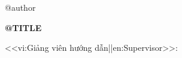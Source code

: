 \begin{titlepage}
  \begin{center}
    {\large\bfseries \university\par}
    {\large\bfseries \faculty\par}
    \vspace{3cm}
    {\large \csname @author\endcsname\par}
    \vspace{1.5cm}
    {\LARGE\bfseries \MakeUppercase{\csname @title\endcsname}\par}
    \vspace{1.5cm}
    {\large \thesistype\par}
    {\large \major\par}
    \vspace{1.5cm}
    {\large <<vi:Giảng viên hướng dẫn||en:Supervisor>>: \supervisor\par}
    \vfill
    {\large \placeyear\par}
  \end{center}
\end{titlepage}
